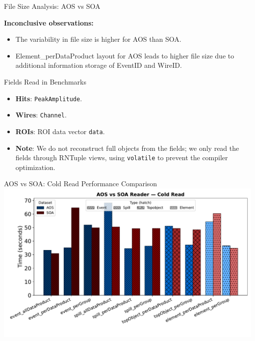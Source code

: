 \documentclass[aspectratio=169]{beamer}
\begin{document}
\begin{frame}{File Size Analysis: AOS vs SOA}
{\begin{minipage}[t]{0.38\textwidth}
    \end{minipage}
  }
  \textbf{Inconclusive observations:}
  \begin{itemize}
    \item The variability in file size is higher for AOS than SOA.
    \item Element\_perDataProduct layout for AOS leads to higher file size due to additional information storage of EventID and WireID. 
  \end{itemize}
\end{frame}

\begin{frame}{Fields Read in Benchmarks}
\small
\begin{itemize}
  \item \textbf{Hits}: \texttt{PeakAmplitude}.
  \item \textbf{Wires}: \texttt{Channel}.
  \item \textbf{ROIs}: ROI data vector \texttt{data}.
  \vspace{1.5em}
  \item \textbf{Note}: We do not reconstruct full objects from the fields; we only read the fields through RNTuple views, using \texttt{volatile} to prevent the compiler optimization.
\end{itemize}
\end{frame}

\begin{frame}{AOS vs SOA: Cold Read Performance Comparison}
\centering
\includegraphics[width=0.8\linewidth]{../experiments/Seaborn/AOS_SOA_Reader_Cold_grouped.pdf}
\end{frame}
\end{document}
